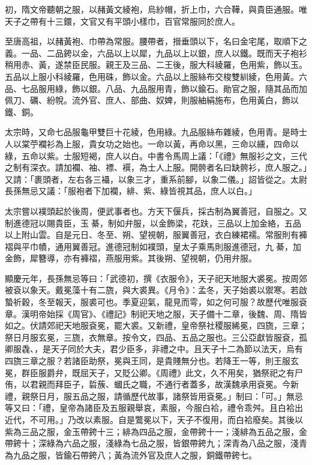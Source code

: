 \begin{pinyinscope}
 初，隋文帝聽朝之服，以赭黃文綾袍，烏紗帽，折上巾，六合鞾，與貴臣通服。唯天子之帶有十三鐶，文官又有平頭小樣巾，百官常服同於庶人。



 至唐高祖，以赭黃袍、巾帶為常服。腰帶者，搢垂頭以下，名曰金宅尾，取順下之義。一品、二品銙以金，六品以上以犀，九品以上以銀，庶人以鐵。既而天子袍衫稍用赤、黃，遂禁臣民服。親王及三品、二王後，服大科綾羅，色用紫，飾以玉。五品以上服小科綾羅，色用硃，飾以金。六品以上服絲布交梭雙紃綾，色用黃。六品、七品服用綠，飾以銀。八品、九品服用青，飾以鍮石。勛官之服，隨其品而加佩刀、礪、紛帨。流外官、庶人、部曲、奴婢，則服紬絹施布，色用黃白，飾以鐵、銅。



 太宗時，又命七品服龜甲雙巨十花綾，色用綠。九品服絲布雜綾，色用青。是時士人以棠苧襴衫為上服，貴女功之始也。一命以黃，再命以黑，三命以纁，四命以綠，五命以紫。士服短褐，庶人以白。中書令馬周上議：「《禮》無服衫之文，三代之制有深衣。請加襴、袖、褾、襈，為士人上服。開骻者名曰缺骻衫，庶人服之。」又請：「裹頭者，左右各三襵，以象三才，重系前腳，以象二儀。」詔皆從之。太尉長孫無忌又議：「服袍者下加襴，緋、紫、綠皆視其品，庶人以白。」



 太宗嘗以襆頭起於後周，便武事者也。方天下偃兵，採古制為翼善冠，自服之。又制進德冠以賜貴臣，玉綦，制如弁服，以金飾梁，花趺，三品以上加金絡，五品以上附山雲。自是元日、冬至、朔、望視朝，服翼善冠，衣白練裙襦。常服則有褲褶與平巾幘，通用翼善冠。進德冠制如襆頭，皇太子乘馬則服進德冠，九綦，加金飾，犀簪導，亦有褲褶，燕服用紫。其後朔、望視朝，仍用弁服。



 顯慶元年，長孫無忌等曰：「武德初，撰《衣服令》，天子祀天地服大裘冕。按周郊被袞以象天。戴冕藻十有二旒，與大裘異。《月令》：孟冬，天子始裘以禦寒。若啟蟄祈穀，冬至報天，服裘可也。季夏迎氣，龍見而雩，如之何可服？故歷代唯服袞章。漢明帝始採《周官》、《禮記》制祀天地之服，天子備十二章，後魏、周、隋皆如之。伏請郊祀天地服袞冕，罷大裘。又新禮，皇帝祭社稷服絺冕，四旒，三章；祭日月服玄冕，三旒，衣無章。按令文，四品、五品之服也。三公亞獻皆服袞，孤卿服毳、，是天子同於大夫，君少臣多，非禮之中。且天子十二為節以法天，烏有四旒三章之服？若諸臣助祭，冕與王同，是貴賤無分也。若降王一等，則王服玄冕，群臣服爵弁，既屈天子，又貶公卿。《周禮》此文，久不用矣，猶祭祀之有尸侑，以君親而拜臣子，硩蔟、蟈氏之職，不通行者蓋多，故漢魏承用袞冕。今新禮，親祭日月，服五品之服，請循歷代故事，諸祭皆用袞冕。」制曰：「可。」無忌等又曰：「禮，皇帝為諸臣及五服親舉哀，素服，今服白袷，禮令乖舛。且白袷出近代，不可用。」乃改以素服。自是鷩冕以下，天子不復用，而白袷廢矣。其後以紫為三品之服，金玉帶銙十三；緋為四品之服，金帶銙十一；淺緋為五品之服，金帶銙十；深綠為六品之服，淺綠為七品之服，皆銀帶銙九；深青為八品之服，淺青為九品之服，皆鍮石帶銙八；黃為流外官及庶人之服，銅鐵帶銙七。




\end{pinyinscope}
